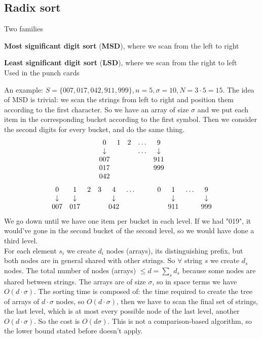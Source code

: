 \documentclass[10pt]{report}
\begin{document}
\subsection{Radix sort} Two families
\begin{list}{}{}
	\item \textbf{Most significant digit sort} (\textbf{MSD}), where we scan from the left to right
	\item \textbf{Least significant digit sort} (\textbf{LSD}), where we scan from the right to left\\
	Used in the punch cards 
\end{list}
An example: $S = \{007, 017, 042, 911, 999\}, n=5, \sigma = 10, N = 3\cdot 5 = 15$. The idea of MSD is trivial: we scan  the strings from left to right and position them according to the first character. So we have an array of size $\sigma$ and we put each item in the corresponding bucket according to the first symbol. Then we consider the second digits for every bucket, and do the same thing.
$$\begin{array}{c c c c c}
	0 & 1 & 2 & \ldots & 9\\
	\downarrow & \ & \ & \ldots & \downarrow\\
	007 & & & & 911\\
	017 & & & & 999\\
	042
\end{array}$$
$$\begin{array}{c c c c c c}
	0 & 1 & 2 & 3 & 4 & \ldots\\
	\downarrow & \downarrow & \ & \ & \downarrow & \\
	007 & 017 & & & 042 &\\
\end{array}\:\:\:\:\:\:\:\:\:\: \begin{array}{c c c c}
	0 & 1 & \ldots & 9\\
	\ & \downarrow & \ & \downarrow \\
	 & 911 & & 999\\
\end{array}$$
We go down until we have one item per bucket in each level. If we had "019", it would've gone in the second bucket of the second level, so we would have done a third level.\\
For each element $s_i$ we create $d_i$ nodes (arrays), its distinguishing prefix, but both nodes are in general shared with other strings. So $\forall$ string $s$ we create $d_s$ nodes. The total number of nodes (arrays) $\leq d = \sum_s d_s$ because some nodes are shared between strings. The arrays are of size $\sigma$, so in space terms we have $O(d\cdot \sigma)$. The sorting time is composed of: the time required to create the tree of arrays of $d\cdot\sigma$ nodes, so $O(d\cdot\sigma)$, then we have to scan the final set of strings, the last level, which is at most every possible node of the last level, another $O(d\cdot\sigma)$. So the cost is $O(d\sigma)$. This is not a comparison-based algorithm, so the lower bound stated before doesn't apply.
\end{document}
